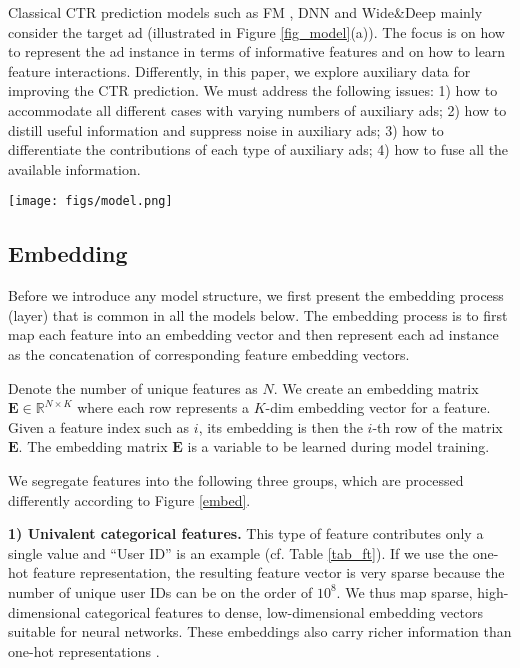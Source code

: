 \documentclass[sigconf]{acmart}
\begin{document}
Classical CTR prediction models such as FM \cite{rendle2010factorization}, DNN \cite{zhang2016deep} and Wide\&Deep \cite{cheng2016wide} mainly consider the target ad (illustrated in Figure \ref{fig_model}(a)). The focus is on how to represent the ad instance in terms of informative features and on how to learn feature interactions.
Differently, in this paper, we explore auxiliary data for improving the CTR prediction. We must address the following issues: 1) how to accommodate all different cases with varying numbers of auxiliary ads; 2) how to distill useful information and suppress noise in auxiliary ads; 3) how to differentiate the contributions of each type of auxiliary ads; 4) how to fuse all the available information.

\begin{figure*}[!t]
\centering
\texttt{[image: figs/model.png]}
\vskip -8pt
\caption{Illustration of model architectures (fts - features). (a) DNN model, which considers only the target ad. (b) DSTN - Pooling model, which further considers auxiliary ads. The aggregation of each type of auxiliary ads is by sum pooling. (c) DSTN - Interactive attention model, which introduces explicit interaction between the auxiliary ads and the target ad.}
\vskip -5pt
\label{fig_model}
\end{figure*}

\subsection{Embedding}
Before we introduce any model structure, we first present the embedding process (layer) that is common in all the models below.
The embedding process is to first map each feature into an embedding vector and then represent each ad instance as the concatenation of corresponding feature embedding vectors.

Denote the number of unique features as $N$. We create an embedding matrix $\mathbf{E} \in \mathbb{R}^{N \times K}$ where each row represents a $K$-dim embedding vector for a feature. Given a feature index such as $i$, its embedding is then the $i$-th row of the matrix $\mathbf{E}$. The embedding matrix $\mathbf{E}$ is a variable to be learned during model training.

We segregate features into the following three groups, which are processed differently according to Figure \ref{embed}.

\textbf{1) Univalent categorical features.} This type of feature contributes only a single value and ``User ID'' is an example (cf. Table \ref{tab_ft}). If we use the one-hot feature representation, the resulting feature vector is very sparse because the number of unique user IDs can be on the order of $10^8$. We thus map sparse, high-dimensional categorical features to dense, low-dimensional embedding vectors suitable for neural networks. These embeddings also carry richer information than one-hot representations \cite{mikolov2013distributed}.
\end{document}
